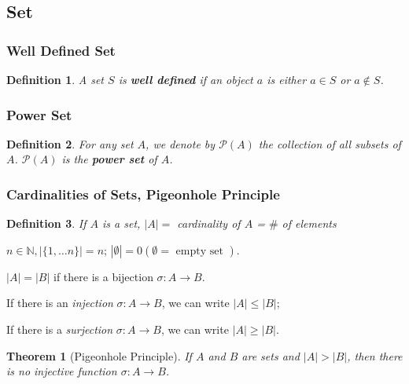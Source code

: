 \documentclass[11pt,a4paper]{article}
\newtheorem{theorem}{Theorem}
\newtheorem{definition}{Definition}
\begin{document}
\subsection{Set}
\subsubsection{Well Defined Set}
\begin{definition}
    A set $S$ is \textbf{well defined} if an object $a$ is either $a\in S$ or $a\notin S$.
\end{definition}
\subsubsection{Power Set}
\begin{definition}
    For any set $A$, we denote by $\mathcal{P}(A)$ the collection of all subsets of $A$. $\mathcal{P}(A)$ is the \textbf{power set} of $A$.
\end{definition}
\subsubsection{Cardinalities of Sets, Pigeonhole Principle}
\begin{definition}
    If $A$ is a set, $|A|=$ cardinality of $A$ = $\#$ of elements
\end{definition}
$n \in \mathbb{N},|\{1, \ldots n\}|=n$; $|\emptyset|=0(\emptyset=\text { empty set })$.

$|A|=|B|$ if there is a bijection $\sigma:A \rightarrow B$.

If there is an \textit{injection} $\sigma:A \rightarrow B$, we can write $|A|\leq|B|$;

If there is a \textit{surjection} $\sigma:A \rightarrow B$, we can write $|A|\geq|B|$.
\begin{theorem}[Pigeonhole Principle]
    If $A$ and $B$ are sets and $|A|>|B|$, then there is no injective function $\sigma:A \rightarrow B$.
\end{theorem}
\end{document}
